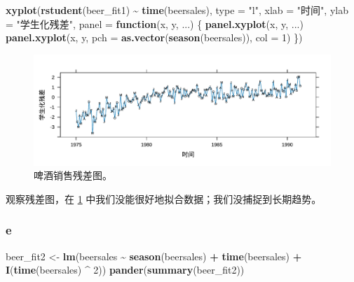 \documentclass[
]{article}
\newenvironment{Shaded}{\begin{snugshade}}{\end{snugshade}}
\newcommand{\AttributeTok}[1]{\textcolor[rgb]{0.13,0.29,0.53}{#1}}
\newcommand{\ControlFlowTok}[1]{\textcolor[rgb]{0.13,0.29,0.53}{\textbf{#1}}}
\newcommand{\DecValTok}[1]{\textcolor[rgb]{0.00,0.00,0.81}{#1}}
\newcommand{\FunctionTok}[1]{\textcolor[rgb]{0.13,0.29,0.53}{\textbf{#1}}}
\newcommand{\NormalTok}[1]{#1}
\newcommand{\OtherTok}[1]{\textcolor[rgb]{0.56,0.35,0.01}{#1}}
\newcommand{\SpecialCharTok}[1]{\textcolor[rgb]{0.81,0.36,0.00}{\textbf{#1}}}
\newcommand{\StringTok}[1]{\textcolor[rgb]{0.31,0.60,0.02}{#1}}
\begin{document}
\begin{Shaded}
\begin{Highlighting}[]
\FunctionTok{xyplot}\NormalTok{(}\FunctionTok{rstudent}\NormalTok{(beer\_fit1) }\SpecialCharTok{\textasciitilde{}} \FunctionTok{time}\NormalTok{(beersales), }\AttributeTok{type =} \StringTok{"l"}\NormalTok{,}
       \AttributeTok{xlab =} \StringTok{"时间"}\NormalTok{, }\AttributeTok{ylab =} \StringTok{"学生化残差"}\NormalTok{,}
       \AttributeTok{panel =} \ControlFlowTok{function}\NormalTok{(x, y, ...) \{}
         \FunctionTok{panel.xyplot}\NormalTok{(x, y, ...)}
         \FunctionTok{panel.xyplot}\NormalTok{(x, y, }\AttributeTok{pch =} \FunctionTok{as.vector}\NormalTok{(}\FunctionTok{season}\NormalTok{(beersales)), }\AttributeTok{col =} \DecValTok{1}\NormalTok{)}
\NormalTok{       \})}
\end{Highlighting}
\end{Shaded}

\begin{figure}
\centering
\includegraphics{chapter3_files/figure-latex/rst-beer-1.pdf}
\caption{\label{fig:rst-beer}啤酒销售残差图。}
\end{figure}

观察残差图，在 \ref{fig:rst-beer} 中我们没能很好地拟合数据；我们没捕捉到长期趋势。

\hypertarget{e-1}{%
\subsubsection*{e}\label{e-1}}

\begin{Shaded}
\begin{Highlighting}[]
\NormalTok{beer\_fit2 }\OtherTok{\textless{}{-}} \FunctionTok{lm}\NormalTok{(beersales }\SpecialCharTok{\textasciitilde{}} \FunctionTok{season}\NormalTok{(beersales) }\SpecialCharTok{+} \FunctionTok{time}\NormalTok{(beersales) }\SpecialCharTok{+}
                  \FunctionTok{I}\NormalTok{(}\FunctionTok{time}\NormalTok{(beersales) }\SpecialCharTok{\^{}} \DecValTok{2}\NormalTok{))}
\FunctionTok{pander}\NormalTok{(}\FunctionTok{summary}\NormalTok{(beer\_fit2))}
\end{Highlighting}
\end{Shaded}
\end{document}
